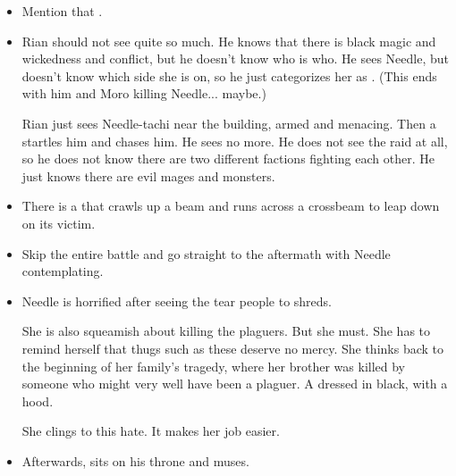 \begin{garbage}
\begin{changes}
\begin{comment}
  \paragraph{The Bleeding Wood}
  \end{comment}
    \begin{itemize}
      \item Mention that . 
      \item Rian should not see quite so much. 
        He knows that there is black magic and wickedness and conflict, but he doesn't know who is who. 
        He sees Needle, but doesn't know which side she is on, so he just categorizes her as .
        (This ends with him and Moro killing Needle... maybe.)
        
        Rian just sees Needle-tachi near the building, armed and menacing. 
        Then a \grimrat{} startles him and chases him. 
        He sees no more. 
        He does not see the raid at all, so he does not know there are two different factions fighting each other. 
        He just knows there are evil mages and monsters. 
      \item 
        There is a \grimrat{} that crawls up a beam and runs across a crossbeam to leap down on its victim. 
      \item 
        Skip the entire battle and go straight to the aftermath with Needle contemplating. 
      \item 
        Needle is horrified after seeing the \grimrats{} tear people to shreds. 
        
        She is also squeamish about killing the plaguers. 
        But she must. 
        She has to remind herself that thugs such as these deserve no mercy. 
        She thinks back to the beginning of her family's tragedy, where her brother was killed by someone who might very well have been a plaguer. 
        A \scatha{} dressed in black, with a hood. 
        
        She clings to this hate. 
        It makes her job easier. 
      \item 
        Afterwards, \Psyrex{} sits on his throne and muses. 
        \begin{prose}
\end{prose}
\end{itemize}
\end{changes}
\end{garbage}
